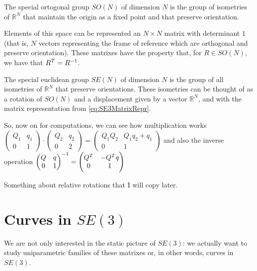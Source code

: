 \documentclass[palatino]{epflnotes}
\begin{document}
\begin{defn} The special ortogonal group $SO(N)$ of dimension $N$ is the group of isometries of $ℝ^N$ that maintain the origin as a fixed point and that preserve orientation.

Elements of this space can be represented an $N × N$ matrix with determinant $1$ (that is, $N$ vectors representing the frame of reference which are orthogonal and preserve orientation). These matrixes have the property that, for $R ∈ SO(N)$, we have that ${R}^{T} = {R}^{-1}$.
\end{defn}

\begin{defn} The special euclidean group $SE(N)$ of dimension $N$ is the group of all isometries of $ℝ^N$ that preserve orientations. These isometries can be thought of as a rotation of $SO(N)$ and a displacement given by a vector $ℝ^N$, and with the matrix representation from \eqref{eq:SE3MatrixRepr}.
\end{defn}

So, now on for computations, we can see how multiplication works \( \label{eq:SE3Mult} \begin{pmatrix} Q_1 & q_1 \\ 0 & 1 \end{pmatrix} ·  \begin{pmatrix} Q_2 & q_2 \\ 0 & 2 \end{pmatrix} = \begin{pmatrix} Q_1 Q_2 & Q_1q_2 + q_1 \\ 0 & 1 \end{pmatrix} \) and also the inverse operation \( \begin{pmatrix} Q & q \\ 0 & 1 \end{pmatrix}^{-1} = \begin{pmatrix} {Q}^{T} & - {Q}^{T} q \\ 0 & 1 \end{pmatrix} \)

Something about relative rotations that I will copy later.

\section{Curves in $SE(3)$}

We are not only interested in the static picture of $SE(3)$: we actually want to study uniparametric families of these matrixes or, in other words, curves in $SE(3)$.
\end{document}
